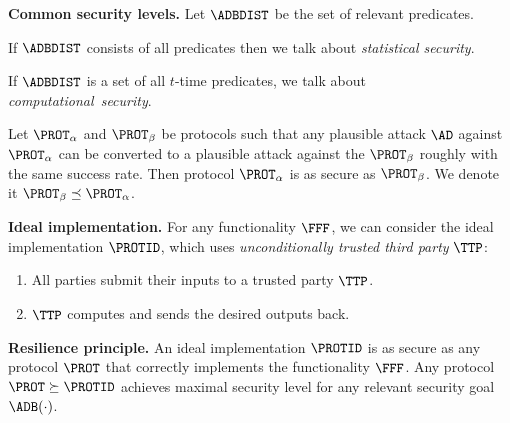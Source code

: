 \documentclass[landscape,footrule]{foils}
\begin{document}
\textbf{Common security levels.} Let $\ADBDIST$ be the set of relevant predicates.
\begin{triangles}
  \item  If $\ADBDIST$ consists of all predicates then we talk
about \emph{statistical security}.
\item  If  $\ADBDIST$ is a set of all $t$-time predicates, we talk
about \emph{computational~security}.

\end{triangles}






Let $\PROT_\alpha$ and $\PROT_\beta$ be protocols such that any
plausible attack $\AD$ against $\PROT_\alpha$ can be converted to a
plausible attack against the $\PROT_\beta$ roughly with the same
success rate. Then protocol $\PROT_\alpha$ is as secure as
$\PROT_\beta$. We denote it $\PROT_\beta\preceq \PROT_\alpha$.
\Bigskip

\textbf{Ideal implementation.} For any functionality $\FFF$, we can consider
the ideal implementation $\PROTID$, which uses \emph{unconditionally
  trusted third party} $\TTP$:
\begin{enumerate}
\item All parties submit their inputs to a trusted party $\TTP$.
\item $\TTP$ computes and sends the desired outputs back. 
\end{enumerate}
\Bigskip

\textbf{Resilience principle.}  An ideal implementation $\PROTID$ is
as secure as any protocol $\PROT$ that correctly implements the
functionality $\FFF$. Any protocol $\PROT\succeq\PROTID$ achieves
maximal security level for any relevant security goal $\ADB(\cdot)$.



\end{document}
